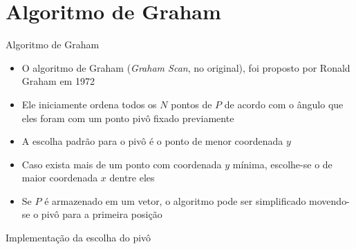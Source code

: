 \section{Algoritmo de Graham}

\begin{frame}[fragile]{Algoritmo de Graham}

    \begin{itemize}
        \item O algoritmo de Graham (\textit{Graham Scan}, no original), foi proposto por
            Ronald Graham em 1972

        \item Ele iniciamente ordena todos os $N$ pontos de $P$ de acordo com o ângulo que eles 
            foram com um ponto pivô fixado previamente

        \item A escolha padrão para o pivô é o ponto de menor coordenada $y$ 

        \item Caso exista mais de um ponto com coordenada $y$ mínima, escolhe-se o de maior 
            coordenada $x$ dentre eles

        \item Se $P$ é armazenado em um vetor, o algoritmo pode ser simplificado movendo-se o pivô 
            para a primeira posição
    \end{itemize}

\end{frame}

\begin{frame}[fragile]{Implementação da escolha do pivô}
\end{frame}

